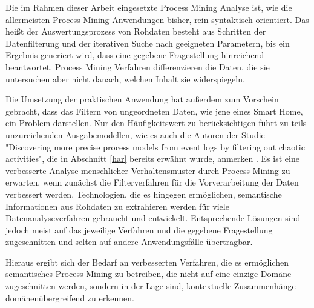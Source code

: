 Die im Rahmen dieser Arbeit eingesetzte Process Mining Analyse ist, wie die allermeisten Process Mining Anwendungen bisher, rein syntaktisch orientiert. Das heißt der Auswertungsprozess von Rohdaten besteht aus Schritten der Datenfilterung und der iterativen Suche nach geeigneten Parametern, bis ein Ergebnis generiert wird, dass eine gegebene Fragestellung hinreichend beantwortet. Process Mining Verfahren differenzieren die Daten, die sie untersuchen aber nicht danach, welchen Inhalt sie widerspiegeln. 

Die Umsetzung der praktischen Anwendung hat außerdem zum Vorschein gebracht, dass das Filtern von ungeordneten Daten, wie jene eines Smart Home, ein Problem darstellen. Nur den Häufigkeitswert zu berücksichtigen führt zu teils unzureichenden Ausgabemodellen, wie es auch die Autoren der Studie "Discovering more precise process models from event logs by filtering out chaotic activities", die in Abschnitt \ref{har} bereits erwähnt wurde, anmerken \cite{Tax2019}. Es ist eine verbesserte Analyse menschlicher Verhaltensmuster durch Process Mining zu erwarten, wenn zunächst die Filterverfahren für die Vorverarbeitung der Daten verbessert werden.
Technologien, die es hingegen ermöglichen, semantische Informationen aus Rohdaten zu extrahieren werden für viele Datenanalyseverfahren gebraucht und entwickelt. Entsprechende Lösungen sind jedoch meist auf das jeweilige Verfahren und die gegebene Fragestellung zugeschnitten und selten auf andere Anwendungsfälle übertragbar. 

Hieraus ergibt sich der Bedarf an verbesserten Verfahren, die es ermöglichen semantisches Process Mining zu betreiben, die nicht auf eine einzige Domäne zugeschnitten werden, sondern in der Lage sind, kontextuelle Zusammenhänge domänenübergreifend zu erkennen.